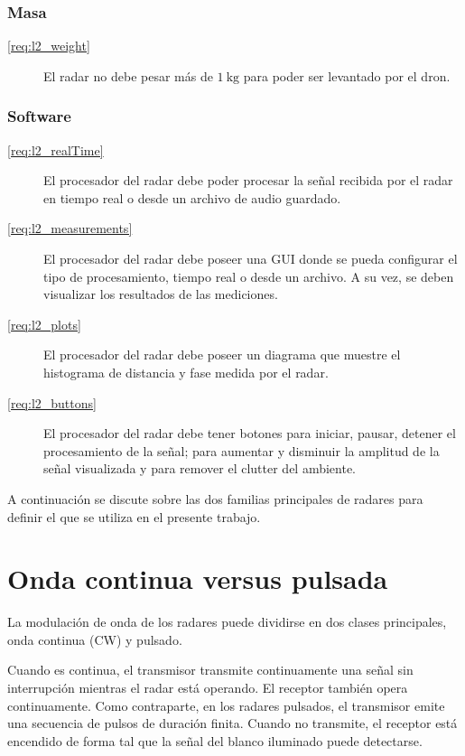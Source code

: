 \subsubsection{Masa}
\begin{description}
  \item[\ref{req:l2_weight}] El radar no debe pesar más de $\SI{1}{\kg}$ para poder ser levantado por el dron.
\end{description}

\subsubsection{Software}
\begin{description}
  \item[\ref{req:l2_realTime}] El procesador del radar debe poder procesar la señal recibida por el radar en tiempo real o desde un archivo de audio guardado.
  \item[\ref{req:l2_measurements}] El procesador del radar debe poseer una GUI donde se pueda configurar el tipo de procesamiento, tiempo real o desde un archivo. A su vez, se deben visualizar los resultados de las mediciones.
  \item[\ref{req:l2_plots}] El procesador del radar debe poseer un diagrama que muestre el histograma de distancia y fase medida por el radar.
  \item[\ref{req:l2_buttons}] El procesador del radar debe tener botones para iniciar, pausar, detener el procesamiento de la señal; para aumentar y disminuir la amplitud de la señal visualizada y para remover el clutter del ambiente. 
\end{description}

A continuación se discute sobre las dos familias principales de radares para definir el que se utiliza en el presente trabajo.

\section{Onda continua versus pulsada}

La modulación de onda de los radares puede dividirse en dos clases principales, onda continua (CW) y pulsado.

Cuando es continua, el transmisor transmite continuamente una señal sin interrupción mientras el radar está operando. El receptor también opera continuamente. Como contraparte, en los radares pulsados, el transmisor emite una secuencia de pulsos de duración finita. Cuando no transmite, el receptor está encendido de forma tal que la señal del blanco iluminado puede detectarse.


